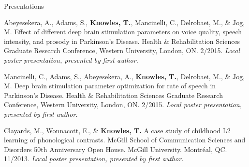 \documentclass{resume} %
\begin{document}
\begin{rSection}{Presentations}
\begin{etaremune}
\item Abeyesekera, A., Adams, S., {\bf Knowles, T.}, Mancinelli, C., Delrobaei, M., \& Jog, M. Effect of different deep brain stimulation parameters on voice quality, speech intensity, and prosody in Parkinson's Disease. Health \& Rehabilitation Sciences Graduate Research Conference, Western University, London, ON. 2/2015.  \emph{Local poster presentation, presented by first author.}
	
\item Mancinelli, C., Adams, S., Abeyesekera, A., {\bf Knowles, T.}, Delrobaei, M., \& Jog, M. Deep brain stimulation parameter optimization for rate of speech in Parkinson's Disease. Health \& Rehabilitation Sciences Graduate Research Conference, Western University, London, ON. 2/2015. \emph{Local poster presentation, presented by first author.}

\item Clayards, M., Wonnacott, E., \& {\bf Knowles, T.} A case study of childhood L2 learning of phonological contrasts. McGill School of Communication Sciences and Disorders 50th Anniversary Open House. McGill University. Montr\'eal, QC. 11/2013. \emph{Local poster presentation, presented by first author.}

\end{etaremune}
\end{rSection}
\end{document}
